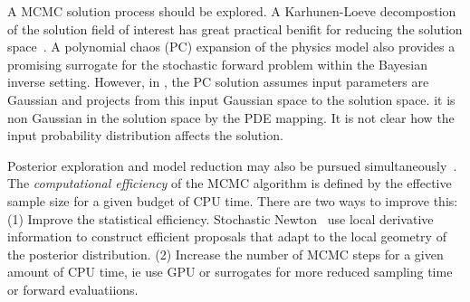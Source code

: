 \documentclass[10pt]{amsart}
\begin{document}
A MCMC solution process should be explored.
A Karhunen-Loeve decompostion of the solution field of interest has great
practical benifit for reducing the solution space~\cite{Marzouk2009}. A
polynomial chaos (PC) expansion of the physics model also provides a
promising surrogate for the stochastic forward problem within the Bayesian
inverse setting. However, in \cite{Marzouk2009}, the PC solution assumes
input parameters are Gaussian and projects from this input Gaussian space to
the solution space.  it is non Gaussian in the solution space by the PDE
mapping. It is not clear how the input probability distribution affects the
solution.


Posterior exploration and model reduction may also be pursued
simultaneously~\cite{CuiWillcox2014}. 
The \textit{computational efficiency} of the MCMC algorithm is
defined by the effective sample size for a given budget of CPU time. There
are two ways to improve this: (1) Improve the statistical efficiency. 
Stochastic Newton~\cite{Martin2012} use local derivative information to
construct efficient proposals that adapt to the local geometry of the posterior distribution.
(2) Increase the number of MCMC steps for a given amount of CPU time, ie use
GPU or surrogates for more reduced sampling time or forward evaluatiions. 



\end{document}
